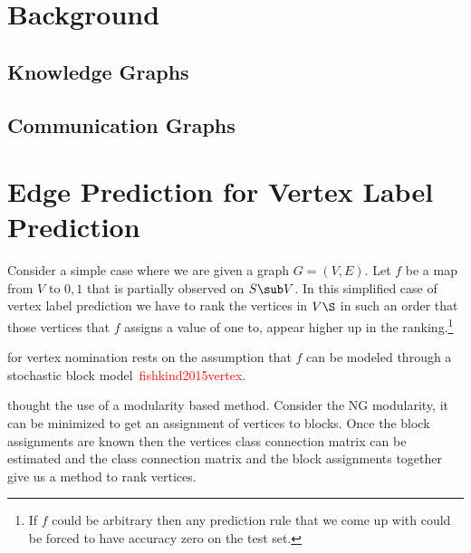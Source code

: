 \documentclass{tufte-handout}
\renewcommand{\cite}[1]{\textcolor{red}{#1}}
\begin{document}
\section{Background}
\label{sec:background}
\subsection{Knowledge Graphs}
\label{sec:knowledge-graphs}

\subsection{Communication Graphs}
\label{sec:communication-graphs}


\section{Edge Prediction for Vertex Label Prediction}
\label{sec:edge-for-vertex}
Consider a simple case where we are given a graph $G = (V, E)$. 
Let $f$ be a map from $V$ to ${0, 1}$ that is partially observed on $S \sub V$.
In this simplified case of vertex label prediction we have to rank the vertices in $V\S$
in such an order that those vertices that $f$ assigns a value of one to, appear higher up in the 
ranking.\footnote{If $f$ could be arbitrary then any prediction rule that we come up with could be 
forced to have accuracy zero on the test set.}

 for vertex nomination rests on the assumption that $f$ can be 
modeled through a stochastic block model~\cite{fishkind2015vertex}. 

 thought the use of a modularity based method. 
Consider the NG modularity, it can be minimized to get an assignment of vertices to 
blocks. Once the block assignments are known then the vertices class connection matrix
can be estimated and the class connection matrix and the block assignments together
give us a method to rank vertices. 
\end{document}
